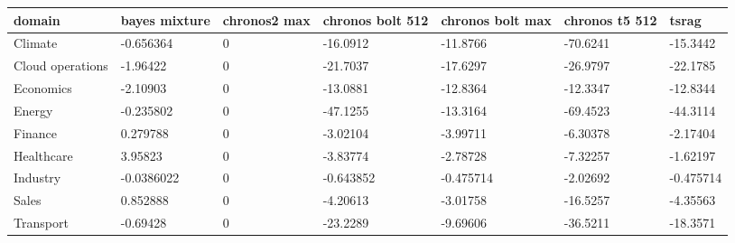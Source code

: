 \begin{tabular}{lllllll}
\toprule
domain & bayes mixture & chronos2 max & chronos bolt 512 & chronos bolt max & chronos t5 512 & tsrag \\
\midrule
Climate & -0.656364 & 0 & -16.0912 & -11.8766 & -70.6241 & -15.3442 \\
Cloud operations & -1.96422 & 0 & -21.7037 & -17.6297 & -26.9797 & -22.1785 \\
Economics & -2.10903 & 0 & -13.0881 & -12.8364 & -12.3347 & -12.8344 \\
Energy & -0.235802 & 0 & -47.1255 & -13.3164 & -69.4523 & -44.3114 \\
Finance & 0.279788 & 0 & -3.02104 & -3.99711 & -6.30378 & -2.17404 \\
Healthcare & 3.95823 & 0 & -3.83774 & -2.78728 & -7.32257 & -1.62197 \\
Industry & -0.0386022 & 0 & -0.643852 & -0.475714 & -2.02692 & -0.475714 \\
Sales & 0.852888 & 0 & -4.20613 & -3.01758 & -16.5257 & -4.35563 \\
Transport & -0.69428 & 0 & -23.2289 & -9.69606 & -36.5211 & -18.3571 \\
\bottomrule
\end{tabular}
